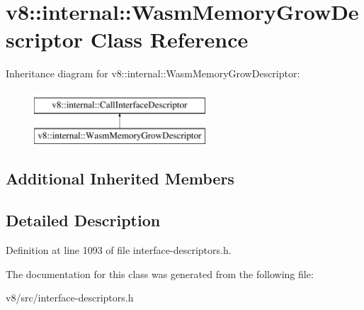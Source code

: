 \hypertarget{classv8_1_1internal_1_1WasmMemoryGrowDescriptor}{}\section{v8\+:\+:internal\+:\+:Wasm\+Memory\+Grow\+Descriptor Class Reference}
\label{classv8_1_1internal_1_1WasmMemoryGrowDescriptor}
Inheritance diagram for v8\+:\+:internal\+:\+:Wasm\+Memory\+Grow\+Descriptor\+:\begin{figure}[H]
\begin{center}
\leavevmode
\includegraphics[height=2.000000cm]{classv8_1_1internal_1_1WasmMemoryGrowDescriptor}
\end{center}
\end{figure}
\subsection*{Additional Inherited Members}


\subsection{Detailed Description}


Definition at line 1093 of file interface-\/descriptors.\+h.



The documentation for this class was generated from the following file\+:\begin{DoxyCompactItemize}
\item 
v8/src/interface-\/descriptors.\+h\end{DoxyCompactItemize}
